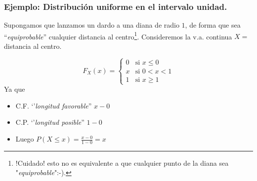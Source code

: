 \documentclass[handout]{beamer}\usepackage[]{graphicx}\usepackage[]{color}
\renewcommand{\leq}{\leqslant}
\renewcommand{\geq}{\geqslant}
\theoremstyle{plain}
\theoremstyle{definition}
\begin{document}
\begin{frame}
\frametitle{Ejemplo: Distribución uniforme en el intervalo unidad.}

Supongamos que lanzamos un dardo a una diana de radio $1$, de forma que sea
``\textit{equiprobable}'' cualquier distancia al centro\footnote{!Cuidado! esto no es equivalente
a que cualquier punto de la diana  sea "\textit{equiprobable}":-).}.
Consideremos la v.a. continua $X=$distancia al centro.

$$F_{X}(x)=\left\{\begin{array}{ll}
0 & \mbox{si } x\leq 0\\
x & \mbox{si } 0<x<1\\
1 & \mbox{si } x\geq 1
\end{array}\right.$$
% 
Ya que
\begin{itemize}
\item C.F. `'\textit{longitud favorable}'' $x-0$
\item C.P. `'\textit{longitud posible}'' $1-0$
\item Luego $P(X\leq x)=\frac{x-0}{1-0}=x$
\end{itemize}

\end{frame}

% 
% 
% 
\end{document}
